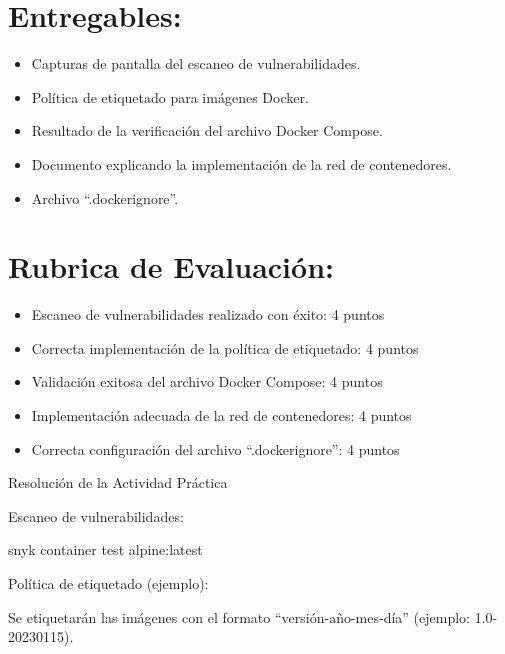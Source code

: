 \documentclass[
  a4paper,
  DIV=11,
  numbers=noendperiod,
  onepage,
  openany]{scrreprt}
\newenvironment{Shaded}{\begin{snugshade}}{\end{snugshade}}
\newcommand{\ExtensionTok}[1]{\textcolor[rgb]{0.00,0.23,0.31}{#1}}
\newcommand{\NormalTok}[1]{\textcolor[rgb]{0.00,0.23,0.31}{#1}}
\providecommand{\tightlist}{%
  \setlength{\itemsep}{0pt}\setlength{\parskip}{0pt}}\usepackage{longtable,booktabs,array}
\begin{document}
\hypertarget{entregables-3}{%
\section{Entregables:}\label{entregables-3}}

\begin{itemize}
\tightlist
\item
  Capturas de pantalla del escaneo de vulnerabilidades.
\item
  Política de etiquetado para imágenes Docker.
\item
  Resultado de la verificación del archivo Docker Compose.
\item
  Documento explicando la implementación de la red de contenedores.
\item
  Archivo ``.dockerignore''.
\end{itemize}

\hypertarget{rubrica-de-evaluaciuxf3n-3}{%
\section{Rubrica de Evaluación:}\label{rubrica-de-evaluaciuxf3n-3}}

\begin{itemize}
\tightlist
\item
  Escaneo de vulnerabilidades realizado con éxito: 4 puntos
\item
  Correcta implementación de la política de etiquetado: 4 puntos
\item
  Validación exitosa del archivo Docker Compose: 4 puntos
\item
  Implementación adecuada de la red de contenedores: 4 puntos
\item
  Correcta configuración del archivo ``.dockerignore'': 4 puntos
\end{itemize}

Resolución de la Actividad Práctica

Escaneo de vulnerabilidades:

\begin{Shaded}
\begin{Highlighting}[]
\ExtensionTok{snyk}\NormalTok{ container test alpine:latest}
\end{Highlighting}
\end{Shaded}

Política de etiquetado (ejemplo):

Se etiquetarán las imágenes con el formato ``versión-año-mes-día''
(ejemplo: 1.0-20230115).
\end{document}

